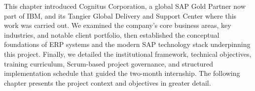 This chapter introduced Cognitus Corporation, a global SAP Gold Partner now part of IBM, and its Tangier Global Delivery and Support Center where this work was carried out. We examined the company's core business areas, key industries, and notable client portfolio, then established the conceptual foundations of ERP systems and the modern SAP technology stack underpinning this project. Finally, we detailed the institutional framework, technical objectives, training curriculum, Scrum-based project governance, and structured implementation schedule that guided the two-month internship. The following chapter presents the project context and objectives in greater detail.
